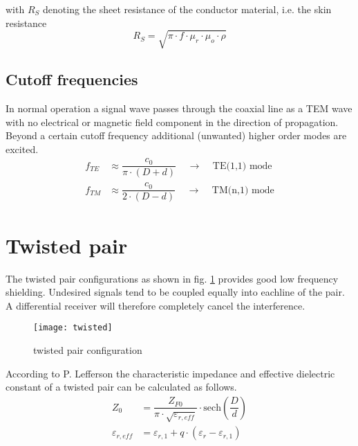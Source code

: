 with $R_S$ denoting the sheet resistance of the conductor material,
i.e. the skin resistance
\begin{equation}
R_S = \sqrt{\pi\cdot f\cdot \mu_r \cdot \mu_o \cdot \rho}
\end{equation}

\subsection{Cutoff frequencies}

In normal operation a signal wave passes through the coaxial line as a
TEM wave with no electrical or magnetic field component in the
direction of propagation.  Beyond a certain cutoff frequency
additional (unwanted) higher order modes are excited.
\begin{align}
f_{TE} &\approx \dfrac{c_0}{\pi\cdot\left(D + d\right)}
\;\;\;\;\rightarrow\;\;\;\; \textrm{TE(1,1) mode}\\
f_{TM} &\approx \dfrac{c_0}{2\cdot\left(D - d\right)}
\;\;\;\;\rightarrow\;\;\;\; \textrm{TM(n,1) mode}
\end{align}

\section{Twisted pair}

The twisted pair configurations as shown in fig. \ref{fig:twisted}
provides good low frequency shielding.  Undesired signals tend to be
coupled equally into eachline of the pair.  A differential receiver
will therefore completely cancel the interference.

\begin{figure}[ht]
\begin{center}
\texttt{[image: twisted]}
\end{center}
\caption{twisted pair configuration}
\label{fig:twisted}
\end{figure}
\FloatBarrier

According to P. Lefferson \cite{Lefferson} the characteristic
impedance and effective dielectric constant of a twisted pair can be
calculated as follows.
\begin{align}
Z_0 &= \dfrac{Z_{F0}}{\pi\cdot\sqrt{\varepsilon_{r,eff}}}\cdot\textrm{sech}\left(\dfrac{D}{d}\right)\\
\label{eq:TPereff}
\varepsilon_{r,eff} &= \varepsilon_{r,1} + q\cdot\left(\varepsilon_r - \varepsilon_{r,1}\right)
\end{align}

